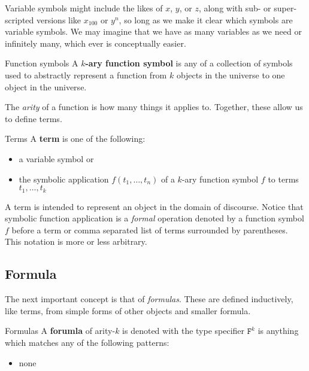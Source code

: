 \documentclass[10pt]{article}
\newcommand{\type}[1]{\texttt{#1}}
\begin{document}
	\noindent 
	Variable symbols might include the likes of $x$, $y$, or $z$, along with sub- or super-scripted versions like $x_{100}$ or $y^n$, so long as we make it clear which symbols are variable symbols.
	We may imagine that we have as many variables as we need or infinitely many, which ever is conceptually easier.
	
	\begin{definition}{Function symbols}{}
		A {\bf $k$-ary function symbol} is any of a collection of symbols used to abstractly represent a function from $k$ objects in the universe to one object in the universe.
	\end{definition}

	\noindent
	The \emph{arity} of a function is how many things it applies to.
	Together, these allow us to define terms.
	
	\begin{definition}{Terms}{}
		A {\bf term} is one of the following:
		\begin{itemize}[noitemsep,topsep=0pt]
			\item a variable symbol or
			\item the symbolic application $f(t_1,\ldots,t_n)$ of a $k$-ary function symbol $f$ to terms $t_1,\ldots,t_k$
		\end{itemize}
	\end{definition}

	\noindent
	A term is intended to represent an object in the domain of discourse.
	Notice that symbolic function application is a \emph{formal} operation denoted by a function symbol $f$ before a term or comma separated list of terms surrounded by parentheses.
	This notation is more or less arbitrary.
	
	\subsection{Formula}
	
	The next important concept is that of \emph{formulas}.
	These are defined inductively, like terms, from simple forms of other objects and smaller formula.
	
	\begin{definition}{Formulas}{}
		A {\bf forumla} of arity-$k$ is denoted with the type specifier $\type{F}^k$ is anything which matches any of the following patterns:
		\begin{itemize}[itemsep=0pt]
			\item none
		\end{itemize}
	\end{definition}
	
\end{document}
